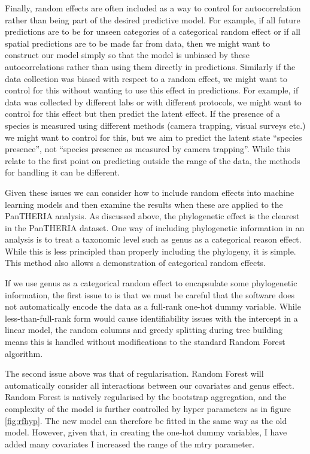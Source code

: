 \documentclass[10pt,]{article}
\begin{document}
Finally, random effects are often included as a way to control for autocorrelation rather than being part of the desired predictive model. For example, if all future predictions are to be for unseen categories of a categorical random effect or if all spatial predictions are to be made far from data, then we might want to construct our model simply so that the model is unbiased by these autocorrelations rather than using them directly in predictions. Similarly if the data collection was biased with respect to a random effect, we might want to control for this without wanting to use this effect in predictions. For example, if data was collected by different labs or with different protocols, we might want to control for this effect but then predict the latent effect. If the presence of a species is measured using different methods (camera trapping, visual surveys etc.) we might want to control for this, but we aim to predict the latent state ``species presence'', not ``species presence as measured by camera trapping''. While this relate to the first point on predicting outside the range of the data, the methods for handling it can be different.

Given these issues we can consider how to include random effects into machine learning models and then examine the results when these are applied to the PanTHERIA analysis. As discussed above, the phylogenetic effect is the clearest in the PanTHERIA dataset. One way of including phylogenetic information in an analysis is to treat a taxonomic level such as genus as a categorical reason effect. While this is less principled than properly including the phylogeny, it is simple. This method also allows a demonstration of categorical random effects.

If we use genus as a categorical random effect to encapsulate some phylogenetic information, the first issue to is that we must be careful that the software does not automatically encode the data as a full-rank one-hot dummy variable. While less-than-full-rank form would cause identifiability issues with the intercept in a linear model, the random columns and greedy splitting during tree building means this is handled without modifications to the standard Random Forest algorithm.

The second issue above was that of regularisation. Random Forest will automatically consider all interactions between our covariates and genus effect. Random Forest is natively regularised by the bootstrap aggregation, and the complexity of the model is further controlled by hyper parameters as in figure \ref{fig:rfhyp}. The new model can therefore be fitted in the same way as the old model. However, given that, in creating the one-hot dummy variables, I have added many covariates I increased the range of the mtry parameter.
\end{document}
